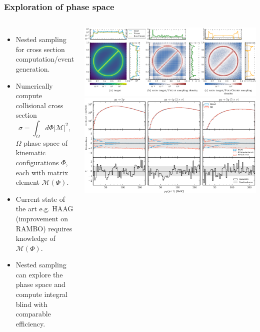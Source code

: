 \documentclass[aspectratio=169]{beamer}
\begin{document}
\begin{frame}
    \frametitle{Exploration of phase space~}
    \begin{columns}
        \begin{itemize}
            \item Nested sampling for cross section computation/event generation.
            \item Numerically compute collisional cross section 
                \vspace{-5pt}\[\sigma = \int_\Omega d\Phi |\mathcal{M}|^2,\]
                $\Omega$ phase space of kinematic configurations $\Phi$, each with matrix element $\mathcal{M}(\Phi)$.
            \item Current state of the art e.g. HAAG (improvement on RAMBO) requires knowledge of $\mathcal{M}(\Phi)$.
            \item Nested sampling can explore the phase space and compute integral blind with comparable efficiency.
        \end{itemize}
        \includegraphics[width=\textwidth]{figures/phase_space_1.pdf}
        \includegraphics[width=\textwidth]{figures/phase_space.pdf}
    \end{columns}
\end{frame}
\end{document}
